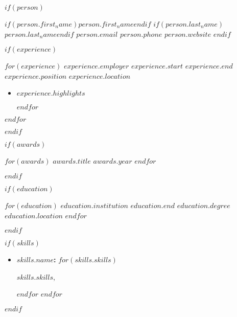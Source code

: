 $if(person)$
\def \fullName{%
  $if(person.first_name)$$person.first_name$$endif$
  $if(person.last_name)$$person.last_name$$endif$
}

\header
    {\fullName}
    {$person.email$}
    {$person.phone$}
    {$person.website$}
$endif$

$if(experience)$

\begin{itemize}[leftmargin=0em, label={}]
    $for(experience)$
    \experience
        {$experience.employer$}
        {$experience.start$}
        {$experience.end$}
        {$experience.position$}
        {$experience.location$}

    \begin{itemize}
      $for(experience.highlights)$
        \item
            \begin{small}
                $experience.highlights$
            \end{small}
        $endfor$
    \end{itemize}
    $endfor$
\end{itemize}
$endif$

$if(awards)$

\begin{itemize}[leftmargin=0em, label={}]
    $for(awards)$
    \award
        {$awards.title$}
        {$awards.year$}
    $endfor$
\end{itemize}
$endif$

$if(education)$

\begin{itemize}[leftmargin=0em, label={}]
    $for(education)$
    \education
        {$education.institution$}
        {$education.end$}
        {$education.degree$}
        {$education.location$}
    $endfor$
\end{itemize}
$endif$

$if(skills)$

\begin{itemize}[leftmargin=0.8em, label={}]
    $for(skills)$
        \item \textbf{$skills.name$:}
          $for(skills.skills)$
            \begin{small}%
                $skills.skills$,%
            \end{small}
          $endfor$
          \vspace{-0.8em}
    $endfor$
\end{itemize}
$endif$

